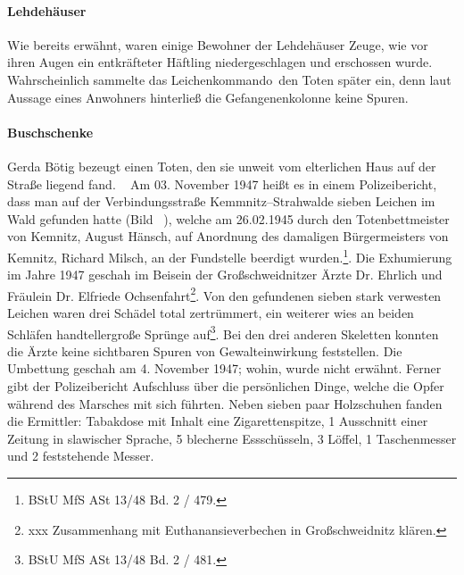 \documentclass[a4paper,12pt,ngerman,
]{nisebook}
\begin{document}
\paragraph{Lehdehäuser}
Wie bereits erwähnt, waren einige Bewohner der Lehdehäuser Zeuge, wie vor ihren Augen ein entkräfteter Häftling niedergeschlagen und erschossen wurde. Wahrscheinlich sammelte das \glqq Leichenkommando\grqq~den Toten später ein, denn laut Aussage eines Anwohners hinterließ die Gefangenenkolonne keine Spuren. 

\paragraph{Buschschenke\label{buschschenke}}
Gerda Bötig bezeugt einen Toten, den sie unweit vom elterlichen Haus auf der Straße liegend fand.
~\newline
Am 03. November 1947 heißt es in einem Polizeibericht, dass man auf der Verbindungsstraße Kemmnitz--Strahwalde sieben Leichen im Wald gefunden hatte (Bild ~), \glqq welche am 26.02.1945 durch den Totenbettmeister von Kemnitz, August Hänsch, auf Anordnung des damaligen Bürgermeisters von Kemnitz, Richard Milsch, an der Fundstelle beerdigt wurden.\grqq\footnote{BStU MfS ASt 13/48 Bd. 2 / 479.}. Die Exhumierung im Jahre 1947 geschah im Beisein der Großschweidnitzer Ärzte Dr. Ehrlich und Fräulein Dr. Elfriede Ochsenfahrt\footnote{xxx Zusammenhang mit Euthanansieverbechen in Großschweidnitz klären.}. Von den gefundenen sieben stark verwesten Leichen waren drei Schädel total zertrümmert, ein weiterer wies an beiden Schläfen handtellergroße Sprünge auf\footnote{BStU MfS ASt 13/48 Bd. 2 / 481.}. Bei den drei anderen Skeletten konnten die Ärzte keine sichtbaren Spuren von Gewalteinwirkung feststellen. Die Umbettung geschah am 4. November 1947; wohin, wurde nicht erwähnt.
\newline
Ferner gibt der Polizeibericht Aufschluss über die persönlichen Dinge, welche die Opfer während des Marsches mit sich führten. Neben sieben paar Holzschuhen fanden die Ermittler:  Tabakdose mit Inhalt eine Zigarettenspitze, 1 Ausschnitt einer Zeitung in slawischer Sprache, 5 blecherne Essschüsseln, 3 Löffel, 1 Taschenmesser und 2 feststehende Messer\grqq.

\end{document}
